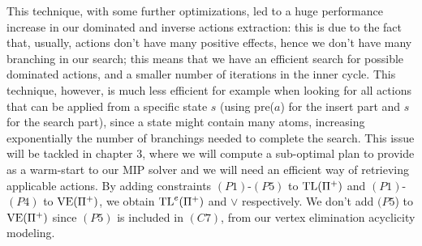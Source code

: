 This technique, with some further optimizations, led to a huge performance increase in our dominated and inverse actions extraction: this is due to the fact that, usually, actions don't have many positive effects, hence we don't have many branching in our search; this means that we have an efficient search for possible dominated actions, and a smaller number of iterations in the inner cycle. This technique, however, is much less efficient for example when looking for all actions that can be applied from a specific state $s$ (using pre($a$) for the insert part and $s$ for the search part), since a state might contain many atoms, increasing exponentially the number of branchings needed to complete the search. This issue will be tackled in chapter $3$, where we will compute a sub-optimal plan to provide as a warm-start to our MIP solver and we will need an efficient way of retrieving applicable actions.
\newline
\newline
By adding constraints $(P1)$-$(P5)$ to $\mbox{TL}(\Pi^+)$ and $(P1)$-$(P4)$ to $\mbox{VE}(\Pi^+)$, we obtain $\mbox{TL}^e(\Pi^+)$ and $\vee$ respectively. We don't add $(P5$) to $\mbox{VE}(\Pi^+)$ since $(P5)$ is included in $(C7)$, from our vertex elimination acyclicity modeling.